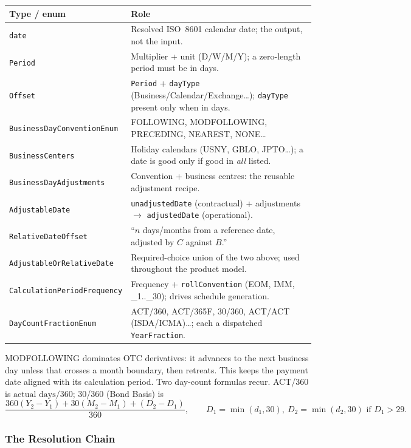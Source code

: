 \begin{center}\small
\begin{tabular}{@{}l >{\raggedright\arraybackslash}p{}@{}}
\toprule
\textbf{Type / enum} & \textbf{Role} \\
\midrule
\texttt{date} & Resolved ISO~8601 calendar date; the output, not the input. \\
\texttt{Period} & Multiplier + unit (D/W/M/Y); a zero-length period must be in days. \\
\texttt{Offset} & \texttt{Period} + \texttt{dayType} (Business/Calendar/Exchange\ldots); \texttt{dayType} present only when in days. \\
\texttt{BusinessDayConventionEnum} & FOLLOWING, MODFOLLOWING, PRECEDING, NEAREST, NONE\ldots \\
\texttt{BusinessCenters} & Holiday calendars (USNY, GBLO, JPTO\ldots); a date is good only if good in \emph{all} listed. \\
\texttt{BusinessDayAdjustments} & Convention + business centres: the reusable adjustment recipe. \\
\texttt{AdjustableDate} & \texttt{unadjustedDate} (contractual) + adjustments $\to$ \texttt{adjustedDate} (operational). \\
\texttt{RelativeDateOffset} & ``$n$ days/months from a reference date, adjusted by $C$ against $B$.'' \\
\texttt{AdjustableOrRelativeDate} & Required-choice union of the two above; used throughout the product model. \\
\texttt{CalculationPeriodFrequency} & Frequency + \texttt{rollConvention} (EOM, IMM, \_1..\_30); drives schedule generation. \\
\texttt{DayCountFractionEnum} & ACT/360, ACT/365F, 30/360, ACT/ACT (ISDA/ICMA)\ldots; each a dispatched \texttt{YearFraction}. \\
\bottomrule
\end{tabular}
\end{center}

\noindent MODFOLLOWING dominates OTC derivatives: it advances to the next business day unless that crosses a month boundary, then retreats. This keeps the payment date aligned with its calculation period. Two day-count formulas recur. ACT/360 is $\text{actual days}/360$; 30/360 (Bond Basis) is
\[
\frac{360(Y_2-Y_1)+30(M_2-M_1)+(D_2-D_1)}{360},\qquad D_1=\min(d_1,30),\ D_2=\min(d_2,30)\text{ if }D_1>29.
\]

\subsubsection{The Resolution Chain}
\label{sec:cdm-date-resolution}

